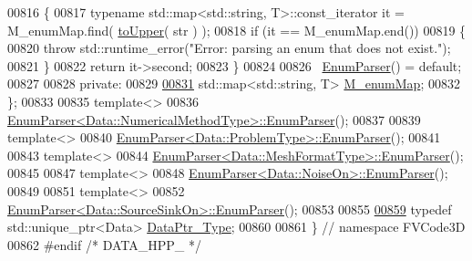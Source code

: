 \begin{DoxyCode}
00816     \{
00817         \textcolor{keyword}{typename} std::map<std::string, T>::const\_iterator it = M\_enumMap.find( 
      \hyperlink{namespaceFVCode3D_aab0ceb729c2ff3e7fd288097aee76a59}{toUpper}( str ) );
00818         \textcolor{keywordflow}{if} (it == M\_enumMap.end())
00819         \{
00820             \textcolor{keywordflow}{throw} std::runtime\_error(\textcolor{stringliteral}{"Error: parsing an enum that does not exist."});
00821         \}
00822         \textcolor{keywordflow}{return} it->second;
00823     \}
00824 
00826     ~\hyperlink{classFVCode3D_1_1EnumParser}{EnumParser}() = \textcolor{keywordflow}{default};
00827 
00828 \textcolor{keyword}{private}:
00829 
\hypertarget{Data_8hpp_source.tex_l00831}{}\hyperlink{classFVCode3D_1_1EnumParser_ac993705140577f6454bb873cb3d89b1b}{00831}     std::map<std::string, T> \hyperlink{classFVCode3D_1_1EnumParser_ac993705140577f6454bb873cb3d89b1b}{M\_enumMap};
00832 \};
00833 
00835 \textcolor{keyword}{template}<>
00836 \hyperlink{classFVCode3D_1_1EnumParser_a9aea725005dd5c0a0f69be19af1a4de0}{EnumParser<Data::NumericalMethodType>::EnumParser}();
00837 
00839 \textcolor{keyword}{template}<>
00840 \hyperlink{classFVCode3D_1_1EnumParser_a9aea725005dd5c0a0f69be19af1a4de0}{EnumParser<Data::ProblemType>::EnumParser}();
00841 
00843 \textcolor{keyword}{template}<>
00844 \hyperlink{classFVCode3D_1_1EnumParser_a9aea725005dd5c0a0f69be19af1a4de0}{EnumParser<Data::MeshFormatType>::EnumParser}();
00845 
00847 \textcolor{keyword}{template}<>
00848 \hyperlink{classFVCode3D_1_1EnumParser_a9aea725005dd5c0a0f69be19af1a4de0}{EnumParser<Data::NoiseOn>::EnumParser}();
00849 
00851 \textcolor{keyword}{template}<>
00852 \hyperlink{classFVCode3D_1_1EnumParser_a9aea725005dd5c0a0f69be19af1a4de0}{EnumParser<Data::SourceSinkOn>::EnumParser}();
00853 
00855 
\hypertarget{Data_8hpp_source.tex_l00859}{}\hyperlink{namespaceFVCode3D_a3d19a370a98afe491a9e17a646a9c56f}{00859} \textcolor{keyword}{typedef} std::unique\_ptr<Data> \hyperlink{namespaceFVCode3D_a3d19a370a98afe491a9e17a646a9c56f}{DataPtr\_Type};
00860 
00861 \} \textcolor{comment}{// namespace FVCode3D}
00862 \textcolor{preprocessor}{#endif }\textcolor{comment}{/* DATA\_HPP\_ */}\textcolor{preprocessor}{}
\end{DoxyCode}
